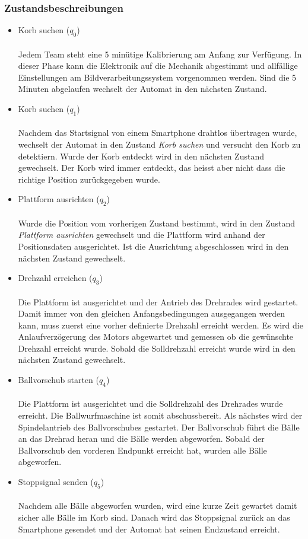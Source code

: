 \subsubsection{Zustandsbeschreibungen}
\begin{itemize}
	
	\item Korb suchen ($q_{0}$) \\ \\
		Jedem Team steht eine 5 minütige Kalibrierung am Anfang zur Verfügung. In dieser Phase kann die Elektronik auf die Mechanik abgestimmt und allfällige Einstellungen am Bildverarbeitungssystem vorgenommen werden. Sind die 5 Minuten abgelaufen wechselt der Automat in den nächsten Zustand.
		
	\item Korb suchen ($q_{1}$) \\ \\
		  Nachdem das Startsignal von einem Smartphone drahtlos übertragen wurde, wechselt der Automat in den Zustand \textit{Korb suchen} und versucht den Korb zu detektiern. Wurde der Korb entdeckt wird in den nächsten Zustand gewechselt. Der Korb wird immer entdeckt, das heisst aber nicht dass die richtige Position zurückgegeben wurde.
		  
	\item Plattform ausrichten ($q_{2}$) \\ \\
		  Wurde die Position vom vorherigen Zustand bestimmt, wird in den Zustand \textit{Plattform ausrichten} gewechselt und die Plattform wird anhand der Positionsdaten ausgerichtet. Ist die Ausrichtung abgeschlossen wird in den nächsten Zustand gewechselt.
		  
	\item Drehzahl erreichen ($q_{3}$) \\ \\
		  Die Plattform ist ausgerichtet und der Antrieb des Drehrades wird gestartet. Damit immer von den gleichen Anfangsbedingungen ausgegangen werden kann, muss zuerst eine vorher definierte Drehzahl erreicht werden. Es wird die Anlaufverzögerung des Motors abgewartet und gemessen ob die gewünschte Drehzahl erreicht wurde. Sobald die Solldrehzahl erreicht wurde wird in den nächsten Zustand gewechselt.
		  
	\item Ballvorschub starten ($q_{4}$) \\ \\
		  Die Plattform ist ausgerichtet und die Solldrehzahl des Drehrades wurde erreicht. Die Ballwurfmaschine ist somit abschussbereit. Als nächstes wird der Spindelantrieb des Ballvorschubes gestartet. Der Ballvorschub führt die Bälle an das Drehrad heran und die Bälle werden abgeworfen. Sobald der Ballvorschub den vorderen Endpunkt erreicht hat, wurden alle Bälle abgeworfen.
		  
	\item Stoppsignal senden ($q_{5}$) \\ \\
		  Nachdem alle Bälle abgeworfen wurden, wird eine kurze Zeit gewartet damit sicher alle Bälle im Korb sind. Danach wird das Stoppsignal zurück an das Smartphone gesendet und der Automat hat seinen Endzustand erreicht.	  
		  
\end{itemize}
